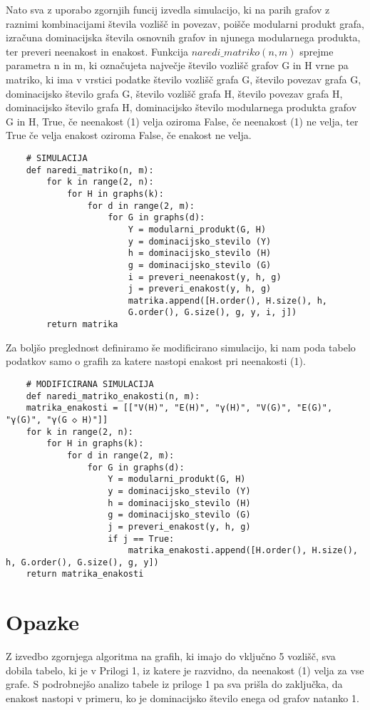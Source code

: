 \documentclass[a4paper,12pt]{article}
\begin{document}
Nato sva z uporabo zgornjih funcij izvedla simulacijo, ki na parih grafov z raznimi kombinacijami števila 
vozlišč in povezav, poišče modularni produkt grafa, izračuna dominacijska števila osnovnih grafov in njunega 
modularnega produkta, ter preveri neenakost in enakost. Funkcija $naredi\_matriko(n, m)$ sprejme parametra n in m, 
ki označujeta največje število vozlišč grafov G in H vrne pa matriko, ki ima v vrstici podatke 
število vozlišč grafa G, število povezav grafa G, dominacijsko število grafa G, 
število vozlišč grafa H, število povezav grafa H, dominacijsko število grafa H, 
dominacijsko število modularnega produkta grafov G in H, True, če neenakost (1) velja oziroma False, če neenakost (1) ne velja,
ter True če velja enakost oziroma False, če enakost ne velja. 

\begin{verbatim}
    # SIMULACIJA 
    def naredi_matriko(n, m):
        for k in range(2, n):
            for H in graphs(k):
                for d in range(2, m):
                    for G in graphs(d):
                        Y = modularni_produkt(G, H)
                        y = dominacijsko_stevilo (Y)
                        h = dominacijsko_stevilo (H)
                        g = dominacijsko_stevilo (G)
                        i = preveri_neenakost(y, h, g)
                        j = preveri_enakost(y, h, g)
                        matrika.append([H.order(), H.size(), h, 
                        G.order(), G.size(), g, y, i, j])
        return matrika
\end{verbatim}

Za boljšo preglednost definiramo še modificirano simulacijo, ki nam poda tabelo podatkov
samo o grafih za katere nastopi enakost pri neenakosti (1).

\begin{verbatim}
    # MODIFICIRANA SIMULACIJA
    def naredi_matriko_enakosti(n, m):
    matrika_enakosti = [["V(H)", "E(H)", "γ(H)", "V(G)", "E(G)", "γ(G)", "γ(G ◇ H)"]]
    for k in range(2, n):
        for H in graphs(k):
            for d in range(2, m):
                for G in graphs(d):
                    Y = modularni_produkt(G, H)
                    y = dominacijsko_stevilo (Y)
                    h = dominacijsko_stevilo (H)
                    g = dominacijsko_stevilo (G)
                    j = preveri_enakost(y, h, g)
                    if j == True:
                        matrika_enakosti.append([H.order(), H.size(), h, G.order(), G.size(), g, y])
    return matrika_enakosti
\end{verbatim}

\section{Opazke}
Z izvedbo zgornjega algoritma na grafih, ki imajo do vključno 5 vozlišč, sva dobila tabelo, ki je v Prilogi 1, iz katere je razvidno, da neenakost (1) velja za vse grafe.
S podrobnejšo analizo tabele iz priloge 1 pa sva prišla do zaključka, da enakost nastopi v primeru, ko je dominacijsko število enega od grafov natanko 1.
\end{document}
